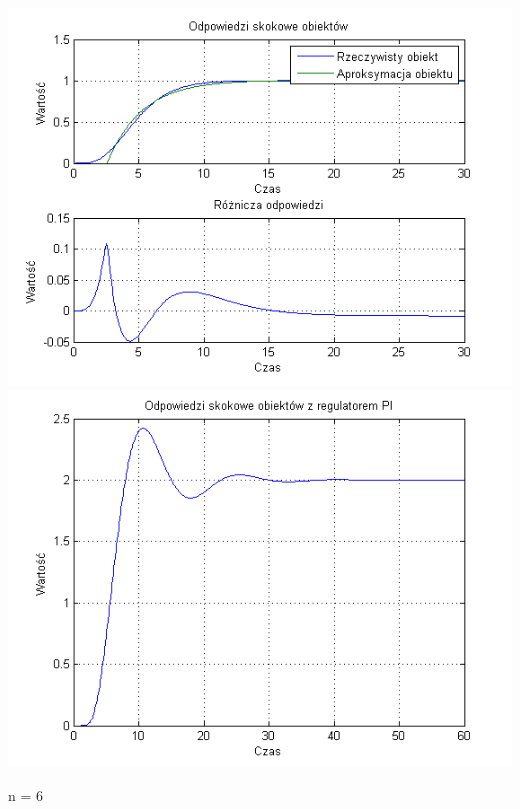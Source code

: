 \documentclass[10pt,a4paper]{article}
\begin{document}
\begin{center}
\includegraphics[scale=1]{images/jeden/skrypt_109.png}\\
\includegraphics[scale=1]{images/jeden/skrypt_110.png}\\
\end{center}
\newpage
n = 6
\end{document}
